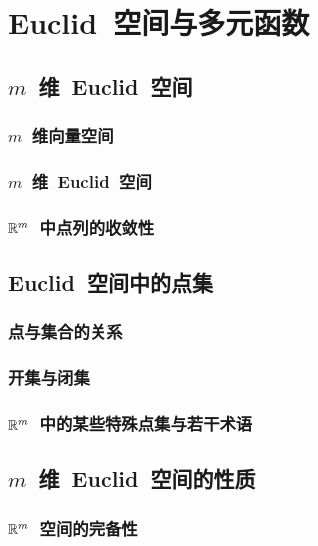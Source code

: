 

\chapter{Euclid~空间与多元函数}\label{ch:15}
\section{$m$~维~Euclid~空间}
\subsection{$m$~维向量空间}
\subsection{$m$~维~Euclid~空间}
\subsection{$\mathbb{R}^m$~中点列的收敛性}
\begin{exercise}

\end{exercise}
\section{Euclid~空间中的点集}
\subsection{点与集合的关系}
\subsection{开集与闭集}
\subsection{$\mathbb{R}^m$~中的某些特殊点集与若干术语}
\begin{exercise}

\end{exercise}
\section{$m$~维~Euclid~空间的性质}
\subsection{$\mathbb{R}^m$~空间的完备性}
